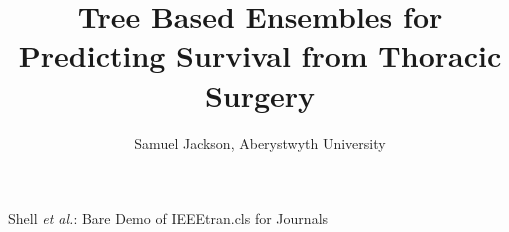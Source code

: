 \documentclass[journal]{IEEEtran}
\begin{document}
%
\title{Tree Based Ensembles for Predicting Survival from Thoracic Surgery}
%
%
%

\author{Samuel Jackson, Aberystwyth University}

% 
%



\markboth{\today}%
{Shell \MakeLowercase{\textit{et al.}}: Bare Demo of IEEEtran.cls for Journals}
% 




\end{document}

